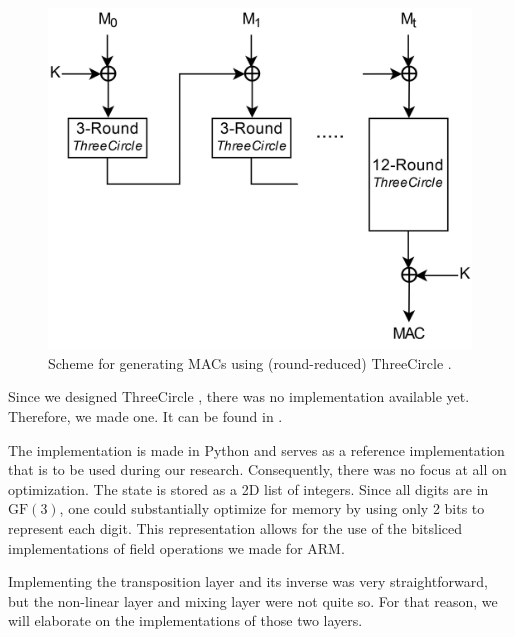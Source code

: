 \documentclass{report}
\newcommand{\GF}{\text{GF}}
\newcommand{\ThreeCircle}{{\sc ThreeCircle} }
\begin{document}
\begin{figure}[!ht]
\centering
\includegraphics[scale=0.120]{imgs/HMAC_HighRes_ThreeCircle.png}
\caption{Scheme for generating MACs using (round-reduced) \ThreeCircle.}
\label{fig:mac3c}
\end{figure}

Since we designed \ThreeCircle, there was no implementation available yet. Therefore, we made one. It can be found in .

The implementation is made in Python and serves as a reference implementation that is to be used during our research. Consequently, there was no focus at all on optimization. The state is stored as a 2D list of integers. Since all digits are in $\GF(3)$, one could substantially optimize for memory by using only 2 bits to represent each digit. This representation allows for the use of the bitsliced implementations of field operations we made for ARM.

Implementing the transposition layer and its inverse was very straightforward, but the non-linear layer and mixing layer were not quite so. For that reason, we will elaborate on the implementations of those two layers.
\end{document}

